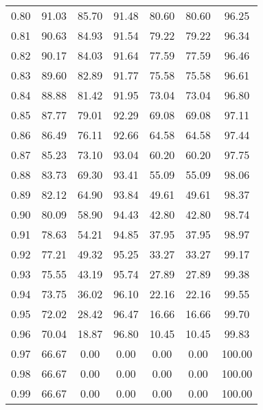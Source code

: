 \begin{tabular}{|c|c|c|c|c|c|c|}
      0.80 &     91.03 &     85.70 &      91.48 &   80.60 &      80.60 &         96.25 \\
      0.81 &     90.63 &     84.93 &      91.54 &   79.22 &      79.22 &         96.34 \\
      0.82 &     90.17 &     84.03 &      91.64 &   77.59 &      77.59 &         96.46 \\
      0.83 &     89.60 &     82.89 &      91.77 &   75.58 &      75.58 &         96.61 \\
      0.84 &     88.88 &     81.42 &      91.95 &   73.04 &      73.04 &         96.80 \\
      0.85 &     87.77 &     79.01 &      92.29 &   69.08 &      69.08 &         97.11 \\
      0.86 &     86.49 &     76.11 &      92.66 &   64.58 &      64.58 &         97.44 \\
      0.87 &     85.23 &     73.10 &      93.04 &   60.20 &      60.20 &         97.75 \\
      0.88 &     83.73 &     69.30 &      93.41 &   55.09 &      55.09 &         98.06 \\
      0.89 &     82.12 &     64.90 &      93.84 &   49.61 &      49.61 &         98.37 \\
      0.90 &     80.09 &     58.90 &      94.43 &   42.80 &      42.80 &         98.74 \\
      0.91 &     78.63 &     54.21 &      94.85 &   37.95 &      37.95 &         98.97 \\
      0.92 &     77.21 &     49.32 &      95.25 &   33.27 &      33.27 &         99.17 \\
      0.93 &     75.55 &     43.19 &      95.74 &   27.89 &      27.89 &         99.38 \\
      0.94 &     73.75 &     36.02 &      96.10 &   22.16 &      22.16 &         99.55 \\
      0.95 &     72.02 &     28.42 &      96.47 &   16.66 &      16.66 &         99.70 \\
      0.96 &     70.04 &     18.87 &      96.80 &   10.45 &      10.45 &         99.83 \\
      0.97 &     66.67 &      0.00 &       0.00 &    0.00 &       0.00 &        100.00 \\
      0.98 &     66.67 &      0.00 &       0.00 &    0.00 &       0.00 &        100.00 \\
      0.99 &     66.67 &      0.00 &       0.00 &    0.00 &       0.00 &        100.00 \\
\bottomrule
\end{tabular}
